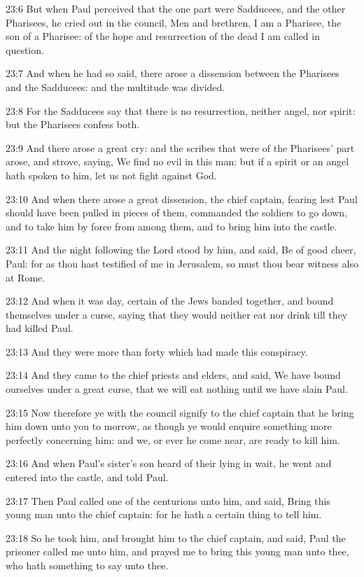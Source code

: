 23:6 But when Paul perceived that the one part were Sadducees, and the
other Pharisees, he cried out in the council, Men and brethren, I am a
Pharisee, the son of a Pharisee: of the hope and resurrection of the
dead I am called in question.

23:7 And when he had so said, there arose a dissension between the
Pharisees and the Sadducees: and the multitude was divided.

23:8 For the Sadducees say that there is no resurrection, neither
angel, nor spirit: but the Pharisees confess both.

23:9 And there arose a great cry: and the scribes that were of the
Pharisees' part arose, and strove, saying, We find no evil in this
man: but if a spirit or an angel hath spoken to him, let us not fight
against God.

23:10 And when there arose a great dissension, the chief captain,
fearing lest Paul should have been pulled in pieces of them, commanded
the soldiers to go down, and to take him by force from among them, and
to bring him into the castle.

23:11 And the night following the Lord stood by him, and said, Be of
good cheer, Paul: for as thou hast testified of me in Jerusalem, so
must thou bear witness also at Rome.

23:12 And when it was day, certain of the Jews banded together, and
bound themselves under a curse, saying that they would neither eat nor
drink till they had killed Paul.

23:13 And they were more than forty which had made this conspiracy.

23:14 And they came to the chief priests and elders, and said, We have
bound ourselves under a great curse, that we will eat nothing until we
have slain Paul.

23:15 Now therefore ye with the council signify to the chief captain
that he bring him down unto you to morrow, as though ye would enquire
something more perfectly concerning him: and we, or ever he come near,
are ready to kill him.

23:16 And when Paul's sister's son heard of their lying in wait, he
went and entered into the castle, and told Paul.

23:17 Then Paul called one of the centurions unto him, and said, Bring
this young man unto the chief captain: for he hath a certain thing to
tell him.

23:18 So he took him, and brought him to the chief captain, and said,
Paul the prisoner called me unto him, and prayed me to bring this
young man unto thee, who hath something to say unto thee.


